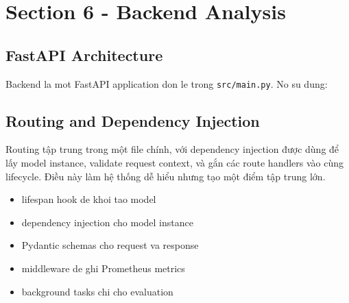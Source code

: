 \section{Section 6 - Backend Analysis}
\subsection{FastAPI Architecture}
Backend la mot FastAPI application don le trong \texttt{src/main.py}. No su dung:
\subsection{Routing and Dependency Injection}
Routing tập trung trong một file chính, với dependency injection được dùng để lấy model instance, validate request context, và gắn các route handlers vào cùng lifecycle. Điều này làm hệ thống dễ hiểu nhưng tạo một điểm tập trung lớn.

\begin{itemize}[leftmargin=1.2em]
  \item lifespan hook de khoi tao model
  \item dependency injection cho model instance
  \item Pydantic schemas cho request va response
  \item middleware de ghi Prometheus metrics
  \item background tasks chi cho evaluation
\end{itemize}

